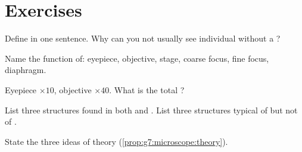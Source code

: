 \section{Exercises}

\begin{exercise}[$\star$]\label{exo:g7:microscope:1}
Define \emph{} in one sentence. Why can you not usually see individual
 without a ?
\end{exercise}

\begin{exercise}[$\star$]\label{exo:g7:microscope:2}
Name the function of: eyepiece, objective, stage, coarse focus, fine focus,
diaphragm.
\end{exercise}

\begin{exercise}[$\star$]\label{exo:g7:microscope:3}
Eyepiece $\times 10$, objective $\times 40$. What is the total
?
\end{exercise}

\begin{exercise}[$\star$]\label{exo:g7:microscope:4}
List three structures found in both  and  . List three
structures typical of   but not of  .
\end{exercise}

\begin{exercise}[$\star$]\label{exo:g7:microscope:5}
State the three ideas of  theory (\cref{prop:g7:microscope:theory}).
\end{exercise}


